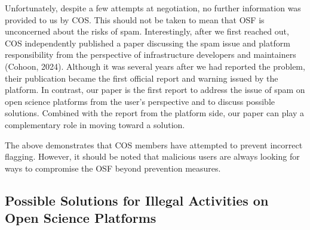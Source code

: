 \documentclass[authordate, meta]{jote-new-article}
\begin{document}
	Unfortunately, despite a few attempts at negotiation, no further information was provided to us by COS. This should not be taken to mean that OSF is unconcerned about the risks of spam. Interestingly, after we first reached out, COS independently published a paper discussing the spam issue and platform responsibility from the perspective of infrastructure developers and maintainers (Cohoon, 2024). Although it was several years after we had reported the problem, their publication became the first official report and warning issued by the platform. In contrast, our paper is the first report to address the issue of spam on open science platforms from the user's perspective and to discuss possible solutions. Combined with the report from the platform side, our paper can play a complementary role in moving toward a solution.



	The above demonstrates that COS members have attempted to prevent incorrect flagging. However, it should be noted that malicious users are always looking for ways to compromise the OSF beyond prevention measures.







	\subsection{Possible Solutions for Illegal Activities on Open Science Platforms}
\end{document}
